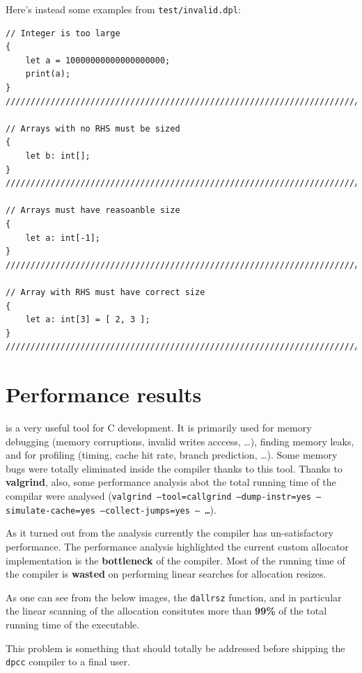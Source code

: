 \documentclass[a4paper]{article}
\newcommand{\urlref}[3][blue]{\href{#2}{\color{#1}{#3}}}%
\begin{document}
Here's instead some examples from \texttt{test/invalid.dpl}:

\begin{lstlisting}[language=DPL]
// Integer is too large
{
    let a = 10000000000000000000;
    print(a);
}
///////////////////////////////////////////////////////////////////////////////

// Arrays with no RHS must be sized
{
    let b: int[];
}
///////////////////////////////////////////////////////////////////////////////

// Arrays must have reasoanble size
{
    let a: int[-1];
}
///////////////////////////////////////////////////////////////////////////////

// Array with RHS must have correct size
{
    let a: int[3] = [ 2, 3 ];
}
///////////////////////////////////////////////////////////////////////////////
\end{lstlisting}


\clearpage

\section{Performance results}

\urlref{https://www.valgrind.org/}{Valgrind} is a very useful tool for C development. It is primarily used for
memory debugging (memory corruptions, invalid writes acccess, \dots), finding memory leaks, and for
profiling (timing, cache hit rate, branch prediction, \dots). Some memory bugs were totally eliminated
inside the compiler thanks to this tool. Thanks to \textbf{valgrind}, also, some performance analysis abot the
total running time of the compilar were analysed (\texttt{valgrind --tool=callgrind --dump-instr=yes --simulate-cache=yes --collect-jumps=yes -- \dots}).

As it turned out from the analysis currently the compiler has un-satisfactory performance. The performance analysis
highlighted the current custom allocator implementation is the \textbf{bottleneck} of the compiler. Most
of the running time of the compiler is \textbf{wasted} on performing linear searches for allocation resizes.

As one can see from the below images, the \texttt{dallrsz} function, and in particular the linear scanning of the allocation
consitutes more than \textbf{99\%} of the total running time of the executable.

This problem is something that should totally be addressed before shipping the \texttt{dpcc} compiler to a final user.
\end{document}
